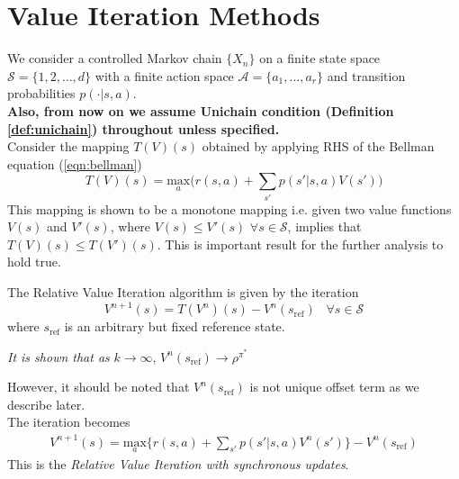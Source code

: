 \documentclass{article}
\theoremstyle{definition}
\begin{document}
\section{Value Iteration Methods}
We consider a controlled Markov chain $\{X_n\}$ on a finite state space $\mathcal{S} = \{1,2,\dotsc,d\}$  with a finite action space $\mathcal{A} = \{a_1,\dotsc,a_r\}$ and transition probabilities $p(\cdot|s,a)$.\\
\textbf{Also, from now on we assume Unichain condition (Definition \ref{def:unichain}) throughout unless specified.}\\

Consider the mapping $T(V)(s)$ obtained by applying RHS of the Bellman equation (\ref{eqn:bellman})
\begin{equation}
    T(V)(s) = \underset{a}{\text{max}} \Big(r(s,a)+\sum_{s'}p(s'|s,a)V(s') \Big)
\end{equation}
This mapping is shown to be a monotone mapping i.e. given two value functions $V(s)$ and $V'(s)$, where $V(s)\leq V'(s)$ $\forall s\in\mathcal{S}$, implies that $T(V)(s)\leq T(V')(s)$. This is important result for the further analysis to hold true.

The Relative Value Iteration algorithm is given by the iteration
\begin{equation}
    V^{n+1}(s) = T(V^n)(s)-V^n(s_{\text{ref}})  \hspace{10pt}\forall s\in\mathcal{S}
\end{equation}
where $s_{\text{ref}}$ is an arbitrary but fixed reference state. 
\begin{center}
    \textit{It is shown that as} $k\rightarrow\infty$, $V^n(s_{\text{ref}})\rightarrow \rho^{\pi^*}$
\end{center}

However, it should be noted that $V^n(s_{\text{ref}})$ is not unique offset term as we describe later.\\
The iteration becomes
\begin{eqnarray}
\label{eqn:rvi}
V^{n+1}(s) = \underset{a}{\text{max}}\Big\{r(s,a)+\sum_{s'}p(s'|s,a)V^n(s')\Big\} - V^n(s_{\text{ref}})
\end{eqnarray}
This is the \textit{Relative Value Iteration with synchronous updates}. 
\end{document}
